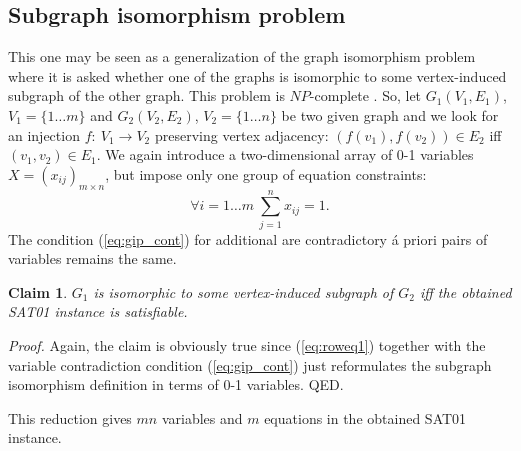 \documentclass[11pt]{article}
\newtheorem{claim}{Claim}
\begin{document}
\subsection{Subgraph isomorphism problem}
This one may be seen as a generalization of the graph isomorphism problem where it is asked whether one of the graphs is isomorphic to some vertex-induced subgraph of the other graph. This problem is $NP$-complete \cite{GJ79}. So, let $G_1(V_1,E_1)$, $V_1=\{1 \ldots m\}$ and $G_2(V_2,E_2)$, $V_2=\{1 \ldots n\}$ be two given graph and we look for an injection $f: \ V_1 \to V_2$ preserving vertex adjacency: $(f(v_1),f(v_2)) \in E_2$ iff $(v_1,v_2) \in E_1$. We again introduce a two-dimensional array of 0-1 variables $X=(x_{ij})_{m \times n}$, but impose only one group of equation constraints:
\begin{equation}
\label{eq:roweq1}
\forall i=1 \ldots m \ \sum_{j=1}^n x_{ij} =1.
\end{equation}
The condition (\ref{eq:gip_cont}) for additional are contradictory \'a priori pairs of variables remains the same.
\begin{claim}
$G_1$ is isomorphic to some vertex-induced subgraph of $G_2$ iff the obtained SAT01 instance is satisfiable.
\end{claim}

{\em Proof.\/} Again, the claim is obviously true since (\ref{eq:roweq1}) together with the variable contradiction condition (\ref{eq:gip_cont}) just reformulates the subgraph isomorphism definition in terms of 0-1 variables. QED.

This reduction gives $mn$ variables and $m$ equations in the obtained SAT01 instance.
\end{document}
